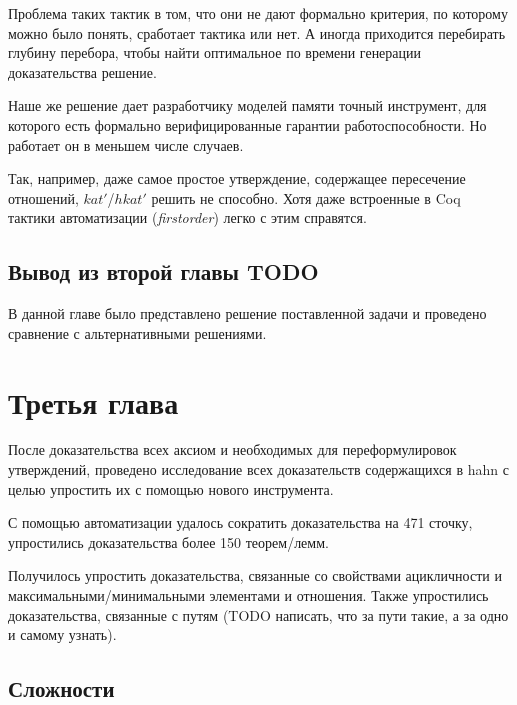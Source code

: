 \documentclass[times
              ]{itmo-student-thesis}
\begin{document}
    Проблема таких тактик в том, что они не дают формально критерия, по которому можно было понять, сработает тактика или нет.
    А иногда приходится перебирать глубину перебора, чтобы найти оптимальное по времени генерации доказательства решение.

    Наше же решение дает разработчику моделей памяти точный инструмент, для которого есть формально верифицированные гарантии работоспособности.
    Но работает он в меньшем числе случаев.

    Так, например, даже самое простое утверждение, содержащее пересечение отношений, $ kat' $/$ hkat' $ решить не способно.
    Хотя даже встроенные в Coq тактики автоматизации (\textit{firstorder}) легко с этим справятся.

  \section{Вывод из второй главы TODO}
    В данной главе было представлено решение поставленной задачи и проведено сравнение с альтернативными решениями.

\chapter{Третья глава}

  После доказательства всех аксиом и необходимых для переформулировок утверждений,
  проведено исследование всех доказательств содержащихся в hahn с целью упростить их с помощью нового инструмента.

  С помощью автоматизации удалось сократить доказательства на 471 сточку, упростились доказательства более 150 теорем/лемм.

  Получилось упростить доказательства, связанные со свойствами ацикличности и максимальными/минимальными элементами и отношения.
  Также упростились доказательства, связанные с путям (TODO написать, что за пути такие, а за одно и самому узнать).

  \section{Сложности}
\end{document}
